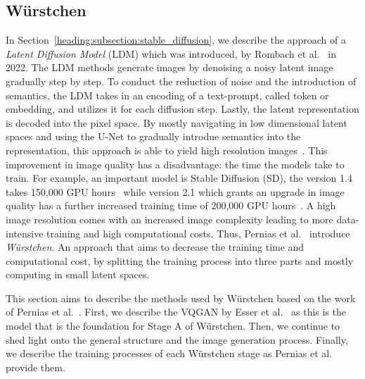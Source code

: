\subsection{W\"urstchen}
In Section~\ref{heading:subsection:stable_diffusion}, we describe the approach
of a \emph{Latent Diffusion Model} (LDM) which was introduced,
by Rombach et al.~\cite{rombach2022stablediffusion} in 2022. The LDM methods
generate images by denoising a noisy latent image gradually step by step. To
conduct the reduction of noise and the introduction of semantics, the LDM takes
in an encoding of a text-prompt, called token or embedding, and utilizes it for
each diffusion step. Lastly, the latent representation is decoded into the
pixel space. By mostly navigating in low dimensional latent spaces and
using the U-Net to gradually introdue semantics into the representation, this
approach is able to yield high resolution images~\cite{rombach2022stablediffusion}.
This improvement in image quality has a disadvantage: the time the models take
to train. For example, an important model is Stable Diffusion (SD), the version
1.4 takes 150,000 GPU hours~\cite{rombach2022sd_1_4} while version 2.1 which
grants an upgrade in image quality has a further increased training time of
200,000 GPU hours~\cite{rombach2023sd_2_1}. A high image resolution comes with
an increased image complexity leading to more data-intensive training and
high computational costs. Thus, Pernias et al.~\cite{pernias2024wrstchen}
introduce \emph{W\"urstchen}. An approach that aims to decrease the training
time and computational cost, by splitting the training process into three parts
and mostly computing in small latent spaces.

This section aims to describe the methods used by W\"urstchen based on the work
of Pernias et al.~\cite{pernias2024wrstchen}. First, we describe the VQGAN by
Esser et al.~\cite{esser2021tamingtransformershighresolutionimage} as this is
the model that is the foundation for Stage A of W\"urstchen. Then, we continue
to shed light onto the general structure and the image generation process. Finally, we
describe the training processes of each W\"urstchen stage as Pernias et al.
provide them.
